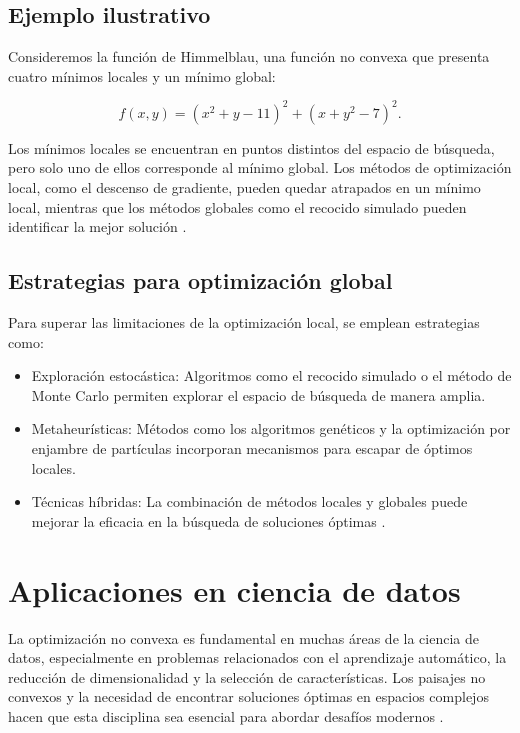 \begin{itemize}
	\subsection{Ejemplo ilustrativo}
	
	Consideremos la función de Himmelblau, una función no convexa que presenta cuatro mínimos locales y un mínimo global:
	
	\begin{equation}
		f(x, y) = (x^2 + y - 11)^2 + (x + y^2 - 7)^2.
	\end{equation}
	
	Los mínimos locales se encuentran en puntos distintos del espacio de búsqueda, pero solo uno de ellos corresponde al mínimo global. Los métodos de optimización local, como el descenso de gradiente, pueden quedar atrapados en un mínimo local, mientras que los métodos globales como el recocido simulado pueden identificar la mejor solución \cite{nocedal1999optimization}.
	
	\subsection{Estrategias para optimización global}
	
	Para superar las limitaciones de la optimización local, se emplean estrategias como:
	\begin{itemize}
		\item Exploración estocástica: Algoritmos como el recocido simulado o el método de Monte Carlo permiten explorar el espacio de búsqueda de manera amplia.
		\item Metaheurísticas: Métodos como los algoritmos genéticos y la optimización por enjambre de partículas incorporan mecanismos para escapar de óptimos locales.
		\item Técnicas híbridas: La combinación de métodos locales y globales puede mejorar la eficacia en la búsqueda de soluciones óptimas \cite{floudas2013deterministic}.
	\end{itemize}
	
	
	\section{Aplicaciones en ciencia de datos}
	
	La optimización no convexa es fundamental en muchas áreas de la ciencia de datos, especialmente en problemas relacionados con el aprendizaje automático, la reducción de dimensionalidad y la selección de características. Los paisajes no convexos y la necesidad de encontrar soluciones óptimas en espacios complejos hacen que esta disciplina sea esencial para abordar desafíos modernos \cite{goodfellow2016deep}.
	

\end{itemize}
